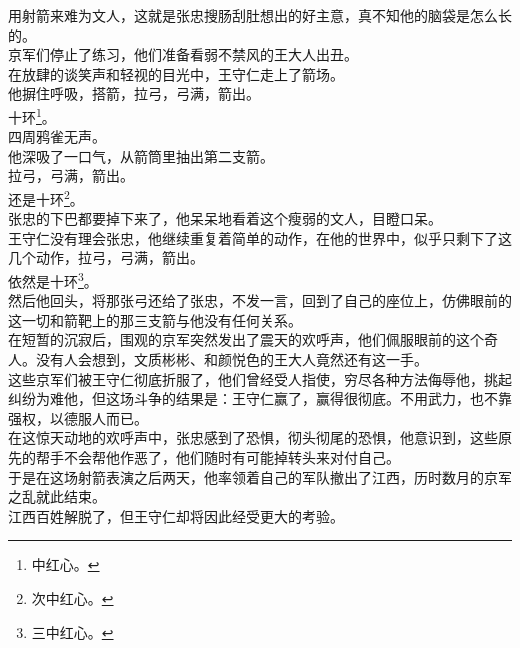 \begin{multicols}{\theparacolNo}
用射箭来难为文人，这就是张忠搜肠刮肚想出的好主意，真不知他的脑袋是怎么长的。\\

京军们停止了练习，他们准备看弱不禁风的王大人出丑。\\

在放肆的谈笑声和轻视的目光中，王守仁走上了箭场。\\

他摒住呼吸，搭箭，拉弓，弓满，箭出。\\

十环\footnote{中红心。}。\\

四周鸦雀无声。\\

他深吸了一口气，从箭筒里抽出第二支箭。\\

拉弓，弓满，箭出。\\

还是十环\footnote{次中红心。}。\\

张忠的下巴都要掉下来了，他呆呆地看着这个瘦弱的文人，目瞪口呆。\\

王守仁没有理会张忠，他继续重复着简单的动作，在他的世界中，似乎只剩下了这几个动作，拉弓，弓满，箭出。\\

依然是十环\footnote{三中红心。}。\\

然后他回头，将那张弓还给了张忠，不发一言，回到了自己的座位上，仿佛眼前的这一切和箭靶上的那三支箭与他没有任何关系。\\

在短暂的沉寂后，围观的京军突然发出了震天的欢呼声，他们佩服眼前的这个奇人。没有人会想到，文质彬彬、和颜悦色的王大人竟然还有这一手。\\

这些京军们被王守仁彻底折服了，他们曾经受人指使，穷尽各种方法侮辱他，挑起纠纷为难他，但这场斗争的结果是：王守仁赢了，赢得很彻底。不用武力，也不靠强权，以德服人而已。\\

在这惊天动地的欢呼声中，张忠感到了恐惧，彻头彻尾的恐惧，他意识到，这些原先的帮手不会帮他作恶了，他们随时有可能掉转头来对付自己。\\

于是在这场射箭表演之后两天，他率领着自己的军队撤出了江西，历时数月的京军之乱就此结束。\\

江西百姓解脱了，但王守仁却将因此经受更大的考验。\\
\ifnum{}
	\end{multicols}
\fi
\newpage
